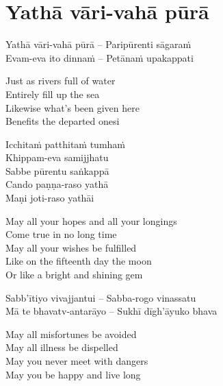 
\clearpage

\section{Yathā vāri-vahā pūrā}

\begin{twochants}
  Yathā vāri-vahā pūrā – Paripūrenti sāgaraṁ\\
  Evam-eva ito dinnaṁ – Petānaṁ upakappati\\
\end{twochants}

\begin{english}
  Just as rivers full of water\\
  Entirely fill up the sea\\
  Likewise what’s been given here\\
  Benefits the departed onesi
\end{english}


\begin{twochants}
  Icchitaṁ patthitaṁ tumhaṁ\\
  Khippam-eva samijjhatu\\
  Sabbe pūrentu saṅkappā\\
  Cando paṇṇa-raso yathā\\
  Maṇi joti-raso yathāi
\end{twochants}

\begin{english}
  May all your hopes and all your longings\\
  Come true in no long time\\
  May all your wishes be fulfilled\\
  Like on the fifteenth day the moon\\
  Or like a bright and shining gem
\end{english}

\begin{twochants}
  Sabb’ītiyo vivajjantui – Sabba-rogo vinassatu\\
  Mā te bhavatv-antarāyo – Sukhī dīgh’āyuko bhava
\end{twochants}

\begin{english}
  May all misfortunes be avoided\\
  May all illness be dispelled\\
  May you never meet with dangers\\
  May you be happy and live long
\end{english}

